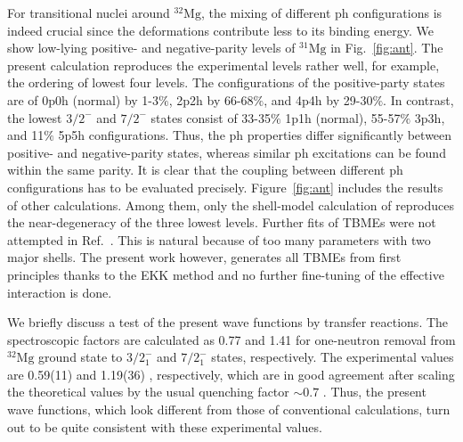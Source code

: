 \documentclass[aps,prl,twocolumn,groupedaddress,showkeys,showpacs,floatfix,superscriptaddress]{revtex4-1}
\def\Nu#1#2#3{{}^{#2}_{#3}\mathrm{#1}}
\newcommand\+{^\dagger}
\begin{document}
For transitional nuclei around $\Nu{Mg}{32}{}$, the mixing of different ph configurations is indeed crucial
since the deformations contribute less to its binding energy.  
We show low-lying positive- and negative-parity levels of $\Nu{Mg}{31}{}$ in Fig.~\ref{fig:ant}.
The present calculation reproduces the experimental levels rather well,   
for example, the ordering of lowest four levels.
The configurations of the positive-party states are of 0p0h (normal) by 1-3$\%$, 
2p2h by 66-68$\%$, and 4p4h by 29-30$\%$.  
In contrast, the lowest $3/2^{-}$ and $7/2^{-}$ states consist of 
33-35$\%$ 1p1h (normal), 55-57$\%$ 3p3h, and 11$\%$ 5p5h configurations.
Thus, the ph properties differ significantly between positive- and negative-parity states, 
whereas similar ph excitations can be found within the same parity.  
It is clear that the coupling between different ph configurations has to be evaluated precisely.  
Figure~\ref{fig:ant} includes the results of other calculations.  Among them, only 
the shell-model calculation of \cite{Caurier:2013aoa} reproduces the
near-degeneracy of
the three lowest levels. Further fits of TBMEs were not attempted in Ref.~\cite{Caurier:2013aoa}.     
This is natural because of too many parameters with two major shells. The present work however,   
generates all TBMEs from first principles thanks to the EKK method and
no further fine-tuning of the effective interaction is done.

We briefly discuss a test of the present wave functions by transfer reactions.
The spectroscopic factors are calculated as 0.77 and 1.41 for one-neutron
removal from $\Nu{Mg}{32}{}$ ground state to $3/2^{-}_1$ and $7/2^{-}_1$ states, respectively.
The experimental values are 0.59(11) and 1.19(36) \cite{terry}, respectively, which are in good 
agreement after scaling the theoretical values by the usual quenching factor $\sim 0.7$ \cite{gadeSF,gadeSF2}.
Thus, the present wave functions, which look different from those of conventional calculations, 
turn out to be quite consistent with these experimental values.
  
\end{document}
